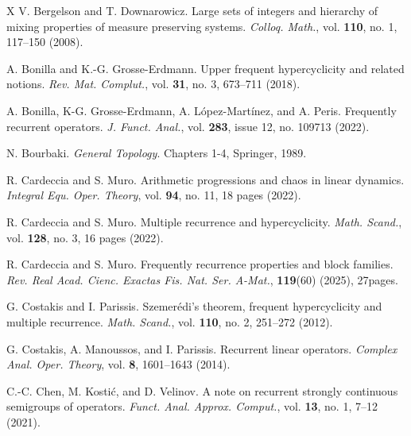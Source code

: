 \documentclass[openright,11pt]{article}
\theoremstyle{plain}
\theoremstyle{definition}
\begin{document}
{\begin{thebibliography}{X}
	 V. Bergelson and T. Downarowicz. Large sets of integers and hierarchy of mixing properties of measure preserving systems. \textit{Colloq. Math.}, vol. \textbf{110}, no. 1, 117--150 (2008).%
	
	 A. Bonilla and K.-G. Grosse-Erdmann. Upper frequent hypercyclicity and related notions. \textit{Rev. Mat. Complut.}, vol. \textbf{31}, no. 3, 673--711 (2018).%
	
	 A. Bonilla, K-G. Grosse-Erdmann, A. L\'opez-Mart\'inez, and A. Peris. Frequently recurrent operators. \textit{J. Funct. Anal.}, vol. \textbf{283}, issue 12, no. 109713 (2022).%
	
	 N. Bourbaki. \textit{General Topology}. Chapters 1-4, Springer, 1989.%
	
	 R. Cardeccia and S. Muro. Arithmetic progressions and chaos in linear dynamics. \textit{Integral Equ. Oper. Theory}, vol. \textbf{94}, no. 11, 18 pages (2022).%
	
	 R. Cardeccia and S. Muro. Multiple recurrence and hypercyclicity. \textit{Math. Scand.}, vol. \textbf{128}, no. 3, 16 pages (2022).%
	
	 R. Cardeccia and S. Muro. Frequently recurrence properties and block families. \textit{Rev. Real Acad. Cienc. Exactas Fis. Nat. Ser. A-Mat.}, \textbf{119}(60) (2025), 27pages.%
	
	 G. Costakis and I. Parissis. Szemer\'edi's theorem, frequent hypercyclicity and multiple recurrence. \textit{Math. Scand.}, vol. \textbf{110}, no. 2, 251--272 (2012).%
	
	 G. Costakis, A. Manoussos, and I. Parissis. Recurrent linear operators. \textit{Complex Anal. Oper. Theory}, vol. \textbf{8}, 1601--1643 (2014).%

	 C.-C. Chen, M. Kosti\'c, and D. Velinov. A note on recurrent strongly continuous semigroups of operators. \textit{Funct. Anal. Approx. Comput.}, vol. \textbf{13}, no. 1, 7--12 (2021).%


\end{thebibliography}}
\end{document}
